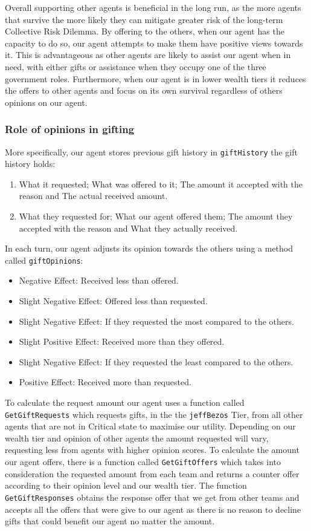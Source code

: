 Overall supporting other agents is beneficial in the long run, as the more agents that survive the more likely they can mitigate greater risk of the long-term Collective Risk Dilemma. By offering to the others, when our agent has the capacity to do so, our agent attempts to make them have positive views towards it. This is advantageous as other agents are likely to assist our agent when in need, with either gifts or assistance when they occupy one of the three government roles. Furthermore, when our agent is in lower wealth tiers it reduces the offers to other agents and focus on its own survival regardless of others opinions on our agent.

\subsubsection{Role of opinions in gifting}
More specifically, our agent stores previous gift history in \texttt{giftHistory} the gift history holds:
\begin{enumerate}
    \item What it requested; What was offered to it; The amount it accepted with the reason and The actual received amount.
    \item What they requested for; What our agent offered them; The amount they accepted with the reason and What they actually received.
\end{enumerate}

In each turn, our agent adjusts its opinion towards the others using a method called \texttt{giftOpinions}:
\begin{itemize}
    \item Negative Effect: Received less than offered.  
    \item Slight Negative Effect: Offered less than requested.
    \item Slight Negative Effect: If they requested the most compared to the others.
    \item Slight Positive Effect: Received more than they offered.
    \item Slight Negative Effect: If they requested the least compared to the others.
    \item Positive Effect: Received more than requested.
\end{itemize}

To calculate the request amount our agent uses a function called \texttt{GetGiftRequests} which requests gifts, in the the \texttt{jeffBezos} Tier,  from all other agents that are not in Critical state to maximise our utility. Depending on our wealth tier and opinion of other agents the amount requested will vary, requesting less from agents with higher opinion scores. To calculate the amount our agent offers, there is a function called \texttt{GetGiftOffers} which takes into consideration the requested amount from each team and returns a counter offer according to their opinion level and our wealth tier. The function \texttt{GetGiftResponses} obtains the response offer that we get from other teams and accepts all the offers that were give to our agent as there is no reason to decline gifts that could benefit our agent no matter the amount. \newline

